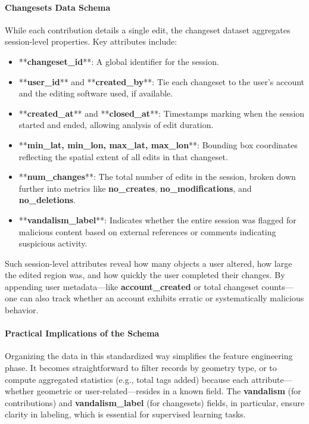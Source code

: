 \documentclass[
    13pt, %
    a4paper, %
    twoside, 
    DIV14, %
    listof=totoc, %
    bibliography=totoc, %
    index=totoc, %
    headsepline
]{scrreprt}
\begin{document}
\paragraph{Changesets Data Schema}
While each contribution details a single edit, the changeset dataset aggregates session-level properties. Key attributes include:
\begin{itemize}
    \item **\textbf{changeset\_id}**: A global identifier for the session.  
    \item **\textbf{user\_id}** and **\textbf{created\_by}**: Tie each changeset to the user’s account and the editing software used, if available.  
    \item **\textbf{created\_at}** and **\textbf{closed\_at}**: Timestamps marking when the session started and ended, allowing analysis of edit duration.  
    \item **\textbf{min\_lat, min\_lon, max\_lat, max\_lon}**: Bounding box coordinates reflecting the spatial extent of all edits in that changeset.  
    \item **\textbf{num\_changes}**: The total number of edits in the session, broken down further into metrics like \textbf{no\_creates}, \textbf{no\_modifications}, and \textbf{no\_deletions}.  
    \item **\textbf{vandalism\_label}**: Indicates whether the entire session was flagged for malicious content based on external references or comments indicating suspicious activity.
\end{itemize}

\noindent
Such session-level attributes reveal how many objects a user altered, how large the edited region was, and how quickly the user completed their changes. By appending user metadata—like \textbf{account\_created} or total changeset counts—one can also track whether an account exhibits erratic or systematically malicious behavior.

\paragraph{Practical Implications of the Schema}
Organizing the data in this standardized way simplifies the feature engineering phase. It becomes straightforward to filter records by geometry type, or to compute aggregated statistics (e.g., total tags added) because each attribute—whether geometric or user-related—resides in a known field. The \textbf{vandalism} (for contributions) and \textbf{vandalism\_label} (for changesets) fields, in particular, ensure clarity in labeling, which is essential for supervised learning tasks.  
\end{document}
